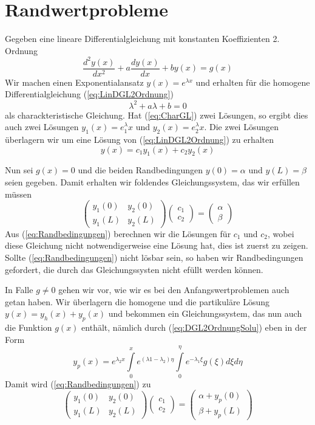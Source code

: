 \section{Randwertprobleme}
Gegeben eine lineare Differentialgleichung mit konstanten Koeffizienten 2. Ordnung
\begin{equation}
    \frac{d^2y(x)}{dx^2}+a\frac{dy(x)}{dx}+by(x)=g(x)
    \label{eq:LinDGL2Ordnung}
\end{equation}
Wir machen einen Exponentialansatz $y(x)=e^{\lambda x}$ und erhalten für die homogene Differentialgleichung (\ref{eq:LinDGL2Ordnung})
\begin{equation}
    \lambda^2+a\lambda+b=0
    \label{eq:CharGL}
\end{equation}
als charackteristische Gleichung. Hat (\ref{eq:CharGL}) zwei Lösungen, so ergibt dies auch zwei Lösungen $y_1(x)=e^\lambda_1 x$ und $y_2(x)=e^\lambda_2x$. Die zwei Lösungen überlagern wir um eine Lösung von (\ref{eq:LinDGL2Ordnung}) zu erhalten
\[ y(x)=c_1 y_1(x)+c_2 y_2(x) \]

Nun sei $g(x)=0$ und die beiden Randbedingungen $y(0)=\alpha$ und $y(L)=\beta$ seien gegeben. Damit erhalten wir foldendes Gleichungssystem, das wir erfüllen müssen
\begin{equation}
    \begin{pmatrix}y_1(0)&y_2(0)\\ y_1(L)&y_2(L)\end{pmatrix}
    \begin{pmatrix}c_1\\ c_2\end{pmatrix} = 
     \begin{pmatrix}\alpha \\ \beta\end{pmatrix}
\label{eq:Randbedingungen}
\end{equation}
Aus (\ref{eq:Randbedingungen}) berechnen wir die Lösungen für $c_1$ und $c_2$, wobei diese Gleichung nicht notwendigerweise eine Lösung hat, dies ist zuerst zu zeigen. Sollte (\ref{eq:Randbedingungen}) nicht lösbar sein, so haben wir Randbedingungen gefordert, die durch das Gleichungssysten nicht efüllt werden können.

In Falle $g\ne 0$ gehen wir vor, wie wir es bei den Anfangswertproblemen auch getan haben. Wir überlagern die homogene und die partikuläre Lösung $y(x)=y_h(x)+y_p(x)$ und bekommen ein Gleichungssystem, das nun auch die Funktion $g(x)$ enthält, nämlich durch (\ref{eq:DGL2OrdnungSolu}) eben in der Form
\[ y_p(x)=e^{\lambda_2 x}\int\limits_0^x e^{(\lambda1-\lambda_2)\eta}\int\limits_0^{\eta}e^{-\lambda_1 \xi}g(\xi)d\xi d\eta\]
Damit wird (\ref{eq:Randbedingungen}) zu
\begin{equation}
    \begin{pmatrix}y_1(0)&y_2(0)\\ y_1(L)&y_2(L)\end{pmatrix}
    \begin{pmatrix}c_1\\ c_2\end{pmatrix} = 
     \begin{pmatrix}\alpha+y_p(0) \\ \beta+y_p(L)\end{pmatrix}
\label{eq:RandBDInhom}
\end{equation}
